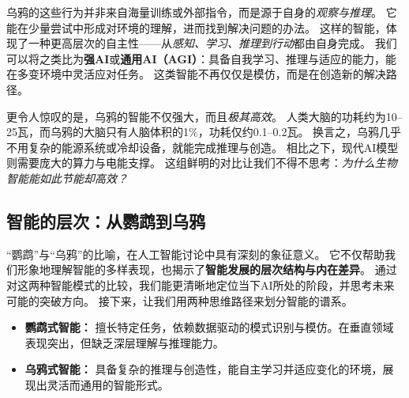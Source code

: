 乌鸦的这些行为并非来自海量训练或外部指令，而是源于自身的\emph{观察与推理}。
它能在少量尝试中形成对环境的理解，进而找到解决问题的办法。
这样的智能，体现了一种更高层次的自主性——从\emph{感知、学习、推理到行动}都由自身完成。
我们可以将之类比为\textbf{强AI}或\textbf{通用AI（AGI）}：具备自我学习、推理与适应的能力，能在多变环境中灵活应对任务。
这类智能不再仅仅是模仿，而是在创造新的解决路径。


更令人惊叹的是，乌鸦的智能不仅强大，而且\emph{极其高效}。
人类大脑的功耗约为10–25瓦，而乌鸦的大脑只有人脑体积的1\%，功耗仅约0.1–0.2瓦。
换言之，乌鸦几乎不用复杂的能源系统或冷却设备，就能完成推理与创造。
相比之下，现代AI模型则需要庞大的算力与电能支撑。
这组鲜明的对比让我们不得不思考：\emph{为什么生物智能能如此节能却高效？}

\subsection{智能的层次：从鹦鹉到乌鸦}



“鹦鹉”与“乌鸦”的比喻，在人工智能讨论中具有深刻的象征意义。
它不仅帮助我们形象地理解智能的多样表现，也揭示了\textbf{智能发展的层次结构与内在差异}。
通过对这两种智能模式的比较，我们能更清晰地定位当下AI所处的阶段，并思考未来可能的突破方向。
接下来，让我们用两种思维路径来划分智能的谱系。

\begin{itemize}
\item \textbf{鹦鹉式智能：} 擅长特定任务，依赖数据驱动的模式识别与模仿。在垂直领域表现突出，但缺乏深层理解与推理能力。
\item \textbf{乌鸦式智能：} 具备复杂的推理与创造性，能自主学习并适应变化的环境，展现出灵活而通用的智能形式。
\end{itemize}

